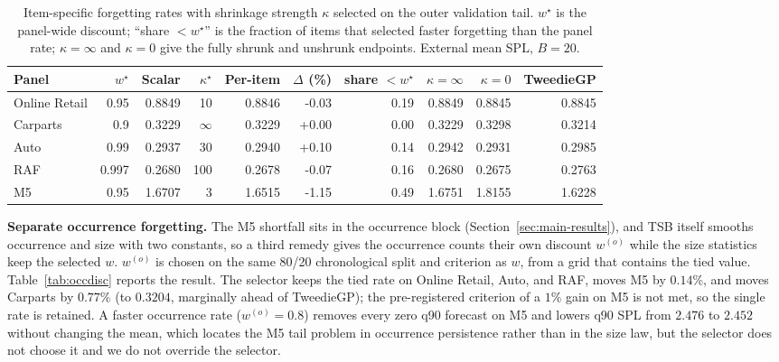\begin{table}[t]
\centering
\caption{Item-specific forgetting rates with shrinkage strength $\kappa$
selected on the outer validation tail. $w^{\star}$ is the panel-wide
discount; ``share $<w^{\star}$'' is the fraction of items that selected
faster forgetting than the panel rate; $\kappa{=}\infty$ and $\kappa{=}0$
give the fully shrunk and unshrunk endpoints. External mean SPL,
$B{=}20$.}
\label{tab:peritem}
\small
\setlength{\tabcolsep}{4pt}
\begin{tabular}{lrrrrrrrrr}
\toprule
Panel & $w^{\star}$ & Scalar & $\kappa^{\star}$ & Per-item & $\Delta$ (\%) & share $<w^{\star}$ & $\kappa{=}\infty$ & $\kappa{=}0$ & TweedieGP\\
\midrule
Online Retail & 0.95 & 0.8849 & 10 & 0.8846 & -0.03 & 0.19 & 0.8849 & 0.8845 & 0.8845\\
Carparts & 0.9 & 0.3229 & $\infty$ & 0.3229 & +0.00 & 0.00 & 0.3229 & 0.3298 & 0.3214\\
Auto & 0.99 & 0.2937 & 30 & 0.2940 & +0.10 & 0.14 & 0.2942 & 0.2931 & 0.2985\\
RAF & 0.997 & 0.2680 & 100 & 0.2678 & -0.07 & 0.16 & 0.2680 & 0.2675 & 0.2763\\
M5 & 0.95 & 1.6707 & 3 & 1.6515 & -1.15 & 0.49 & 1.6751 & 1.8155 & 1.6228\\
\bottomrule
\end{tabular}
\end{table}

\textbf{Separate occurrence forgetting.} The M5 shortfall sits in the
occurrence block (Section~\ref{sec:main-results}), and TSB itself smooths
occurrence and size with two constants, so a third remedy gives the
occurrence counts their own discount $w^{(o)}$ while the size statistics
keep the selected $w$. $w^{(o)}$ is chosen on the same 80/20 chronological
split and criterion as $w$, from a grid that contains the tied value.
Table~\ref{tab:occdisc} reports the result. The selector keeps the tied
rate on Online Retail, Auto, and RAF, moves M5 by $0.14\%$, and moves
Carparts by $0.77\%$ (to $0.3204$, marginally ahead of TweedieGP); the
pre-registered criterion of a $1\%$ gain on M5 is not met, so the single
rate is retained. A faster occurrence rate ($w^{(o)}{=}0.8$) removes every
zero q90 forecast on M5 and lowers q90 SPL from $2.476$ to $2.452$ without
changing the mean, which locates the M5 tail problem in occurrence
persistence rather than in the size law, but the selector does not choose
it and we do not override the selector.

